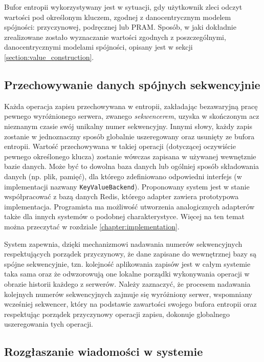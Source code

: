 Bufor entropii wykorzystywany jest w sytuacji, gdy użytkownik zleci odczyt wartości pod określonym kluczem, zgodnej z danocentrycznym modelem spójności: przyczynowej, podręcznej lub PRAM. Sposób, w jaki dokładnie zrealizowane zostało wyznaczanie wartości zgodnych z poszczególnymi, danocentrycznymi modelami spójności, opisany jest w sekcji \ref{section:value_construction}.

\subsection{Przechowywanie danych spójnych sekwencyjnie}

Każda operacja zapisu przechowywana w entropii, zakładając bezawaryjną pracę pewnego wyróżnionego serwera, zwanego \textit{sekwencerem}, uzyska w skończonym acz nieznanym czasie swój unikalny numer sekwencyjny. Innymi słowy, każdy zapis zostanie w jednoznaczny sposób globalnie uszeregowany oraz usunięty ze bufora entropii. Wartość przechowywana w takiej operacji (dotyczącej oczywiście pewnego określonego klucza) zostanie wówczas zapisana w używanej wewnętznie bazie danych. Może być to dowolna baza danych lub ogólniej sposób składowania danych (np. plik, pamięć), dla którego zdefiniowano odpowiedni interfejs (w implementacji nazwany \texttt{KeyValueBackend}). Proponowany system jest w stanie współpracować z bazą danych Redis, którego adapter zawiera prototypowa implementacja. Programista ma możliwość utworzenia analogicznych adapterów także dla innych systemów o podobnej charakterystyce. Więcej na ten temat można przeczytać w rozdziale \ref{chapter:implementation}.

System zapewnia, dzięki mechanizmowi nadawania numerów sekwencyjnych respektujących porządek przyczynowy, że dane zapisane do wewnętrznej bazy są spójne sekwencyjnie, tzn. kolejność aplikowania zapisów jest w całym systemie taka sama oraz że odwzorowują one lokalne porządki wykonywania operacji w obrazie historii każdego z serwerów. Należy zaznaczyć, że procesem nadawania kolejnych numerów sekwencyjnych zajmuje się wyróżniony serwer, wspomniany wcześniej sekwencer, który na podstawie zawartości swojego bufora entropii oraz respektując porządek przyczynowy operacji zapisu, dokonuje globalnego uszeregowania tych operacji.

\subsection{Rozgłaszanie wiadomości w systemie}

